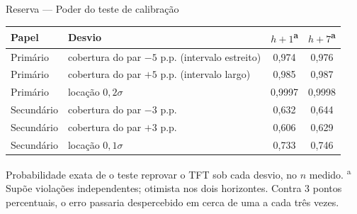 \documentclass[aspectratio=169,10pt]{beamer}
\newcommand{\hum}{\(h{+}1\)}
\newcommand{\hsete}{\(h{+}7\)}
\begin{document}
\begin{frame}{Reserva --- Poder do teste de calibração}
  \centering
  \begin{tabular}{l l c c}
    \toprule
    Papel & Desvio & \hum\textsuperscript{a} & \hsete\textsuperscript{a} \\
    \midrule
    Primário & cobertura do par \(-5\) p.p. (intervalo estreito) & 0,974 & 0,976 \\
    Primário & cobertura do par \(+5\) p.p. (intervalo largo) & 0,985 & 0,987 \\
    Primário & locação \(0{,}2\sigma\) & 0,9997 & 0,9998 \\
    Secundário & cobertura do par \(-3\) p.p. & 0,632 & 0,644 \\
    Secundário & cobertura do par \(+3\) p.p. & 0,606 & 0,629 \\
    Secundário & locação \(0{,}1\sigma\) & 0,733 & 0,746 \\
    \bottomrule
  \end{tabular}

  \vspace{6pt}
  \raggedright\small
  Probabilidade exata de o teste reprovar o TFT sob cada desvio, no \(n\) medido.
  \textsuperscript{a} Supõe violações independentes; otimista nos dois horizontes.
  Contra 3 pontos percentuais, o erro passaria despercebido em cerca de uma a cada três vezes.
\end{frame}
\end{document}
